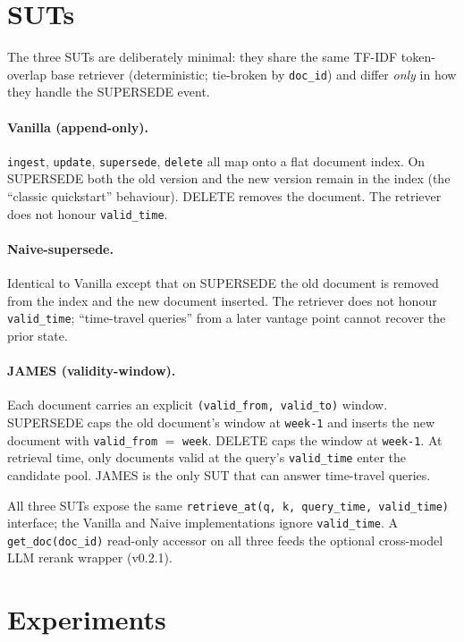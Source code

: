 \documentclass[11pt,a4paper]{article}
\begin{document}
\section{SUTs}
\label{sec:suts}

The three SUTs are deliberately minimal: they share the same TF-IDF token-overlap base retriever (deterministic; tie-broken by \texttt{doc\_id}) and differ \emph{only} in how they handle the SUPERSEDE event.

\paragraph{Vanilla (append-only).} \texttt{ingest}, \texttt{update}, \texttt{supersede}, \texttt{delete} all map onto a flat document index. On SUPERSEDE both the old version and the new version remain in the index (the ``classic quickstart'' behaviour). DELETE removes the document. The retriever does not honour \texttt{valid\_time}.

\paragraph{Naive-supersede.} Identical to Vanilla except that on SUPERSEDE the old document is removed from the index and the new document inserted. The retriever does not honour \texttt{valid\_time}; ``time-travel queries'' from a later vantage point cannot recover the prior state.

\paragraph{JAMES (validity-window).} Each document carries an explicit \texttt{(valid\_from, valid\_to)} window. SUPERSEDE caps the old document's window at \texttt{week-1} and inserts the new document with \texttt{valid\_from} $=$ \texttt{week}. DELETE caps the window at \texttt{week-1}. At retrieval time, only documents valid at the query's \texttt{valid\_time} enter the candidate pool. JAMES is the only SUT that can answer time-travel queries.

All three SUTs expose the same \texttt{retrieve\_at(q, k, query\_time, valid\_time)} interface; the Vanilla and Naive implementations ignore \texttt{valid\_time}. A \texttt{get\_doc(doc\_id)} read-only accessor on all three feeds the optional cross-model LLM rerank wrapper (v0.2.1).

\section{Experiments}
\label{sec:experiments}
\end{document}
